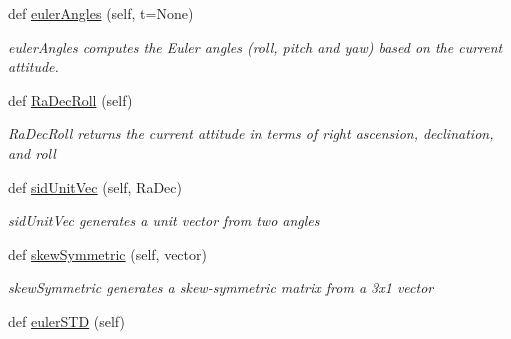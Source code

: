 \begin{DoxyCompactItemize}
def \hyperlink{classmodest_1_1substates_1_1attitude_1_1Attitude_a39613e54a98638ebae88539212c723c9}{euler\+Angles} (self, t=None)
\begin{DoxyCompactList}\small\item\em euler\+Angles computes the Euler angles (roll, pitch and yaw) based on the current attitude. \end{DoxyCompactList}\item 
def \hyperlink{classmodest_1_1substates_1_1attitude_1_1Attitude_a6fdadf88372f53c3ac216eaf015947db}{Ra\+Dec\+Roll} (self)
\begin{DoxyCompactList}\small\item\em Ra\+Dec\+Roll returns the current attitude in terms of right ascension, declination, and roll \end{DoxyCompactList}\item 
def \hyperlink{classmodest_1_1substates_1_1attitude_1_1Attitude_ae6d69671cf2517be4ad69bee7498e665}{sid\+Unit\+Vec} (self, Ra\+Dec)
\begin{DoxyCompactList}\small\item\em sid\+Unit\+Vec generates a unit vector from two angles \end{DoxyCompactList}\item 
def \hyperlink{classmodest_1_1substates_1_1attitude_1_1Attitude_ae6f156a198d9c2328ddffde498c1ca19}{skew\+Symmetric} (self, vector)
\begin{DoxyCompactList}\small\item\em skew\+Symmetric generates a skew-\/symmetric matrix from a 3x1 vector \end{DoxyCompactList}\item 
def \hyperlink{classmodest_1_1substates_1_1attitude_1_1Attitude_a6d0d2b9fcd181bdbf9cb55f370e1b575}{euler\+S\+TD} (self)
\end{DoxyCompactItemize}
